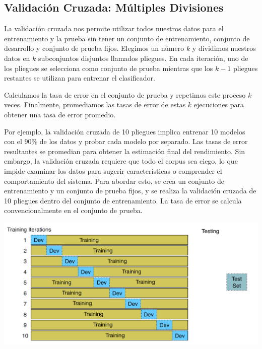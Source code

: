 \subsection{Validación Cruzada: Múltiples Divisiones}

La validación cruzada nos permite utilizar todos nuestros datos para el entrenamiento y la prueba sin tener un conjunto de entrenamiento, conjunto de desarrollo y conjunto de prueba fijos.  Elegimos un número $k$ y dividimos nuestros datos en $k$ subconjuntos disjuntos llamados pliegues.  En cada iteración, uno de los pliegues se selecciona como conjunto de prueba mientras que los $k-1$ pliegues restantes se utilizan para entrenar el clasificador.

Calculamos la tasa de error en el conjunto de prueba y repetimos este proceso $k$ veces.  Finalmente, promediamos las tasas de error de estas $k$ ejecuciones para obtener una tasa de error promedio.

Por ejemplo, la validación cruzada de 10 pliegues implica entrenar 10 modelos con el 90\% de los datos y probar cada modelo por separado.  Las tasas de error resultantes se promedian para obtener la estimación final del rendimiento. Sin embargo, la validación cruzada requiere que todo el corpus sea ciego, lo que impide examinar los datos para sugerir características o comprender el comportamiento del sistema.  Para abordar esto, se crea un conjunto de entrenamiento y un conjunto de prueba fijos, y se realiza la validación cruzada de 10 pliegues dentro del conjunto de entrenamiento.  La tasa de error se calcula convencionalmente en el conjunto de prueba.


\begin{center}
\includegraphics[scale=0.28]{pics/cv.png}
\end{center}

